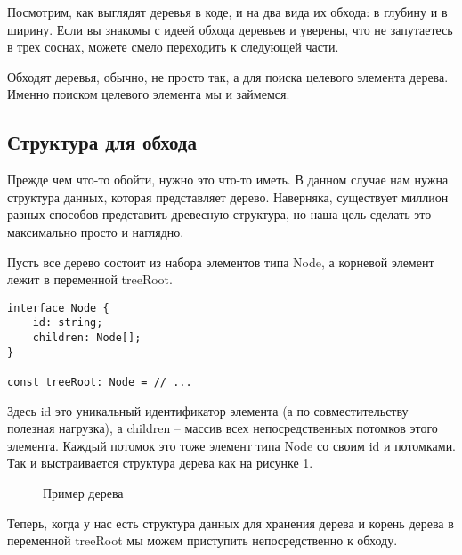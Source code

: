 \documentclass[../../article]{subfiles}
\begin{document}
{Посмотрим, как выглядят деревья в коде, и на два вида их обхода: в глубину и в ширину. Если вы знакомы с идеей обхода деревьев и уверены, что не запутаетесь в трех соснах, можете смело переходить к следующей части.}

Обходят деревья, обычно, не просто так, а для поиска целевого элемента дерева. Именно поиском целевого элемента мы и займемся.

\subsection{Структура для обхода}

Прежде чем что-то обойти, нужно это что-то иметь. В данном случае нам нужна структура данных, которая представляет дерево. Наверняка, существует миллион разных способов представить древесную структура, но наша цель сделать это максимально просто и наглядно.

Пусть все дерево состоит из набора элементов типа {\firacodebold Node}, а корневой элемент лежит в переменной {\firacodebold treeRoot}.
    \begin{ruledelement}
        \begin{lstlisting}[label={lst:treeStructure}]
interface Node {
    id: string;
    children: Node[];
}

const treeRoot: Node = // ...
        \end{lstlisting}
    \end{ruledelement}

Здесь {\firacodebold id} это уникальный идентификатор элемента (а по совместительству полезная нагрузка), а {\firacodebold children} – массив всех непосредственных потомков этого элемента. Каждый потомок это тоже элемент типа {\firacodebold Node} со своим {\firacodebold id} и потомками. Так и выстраивается структура дерева как на рисунке \ref{fig:exampleTree}.

\begin{figure}
    \caption{Пример дерева}
    \label{fig:exampleTree}
\end{figure}

Теперь, когда у нас есть структура данных для хранения дерева и корень дерева в переменной {\firacodebold treeRoot} мы можем приступить непосредственно к обходу.
\end{document}
